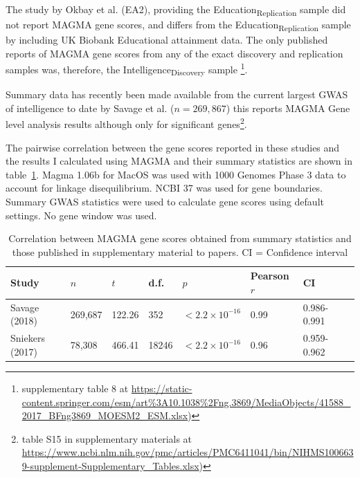 The study by Okbay et al. (EA2)\cite{okbay2016genome}, providing the Education\textsubscript{Replication} sample did not report MAGMA gene scores, and differs from the Education\textsubscript{Replication} sample by including UK Biobank Educational attainment data. The only published reports of MAGMA gene scores from any of the exact discovery and replication samples was, therefore, the Intelligence\textsubscript{Discovery} sample \cite{sniekers2017genome}\footnote{supplementary table 8 at \url{https://static-content.springer.com/esm/art\%3A10.1038\%2Fng.3869/MediaObjects/41588_2017_BFng3869_MOESM2_ESM.xlsx})}.

Summary data has recently been made available from the current largest GWAS of intelligence to date by Savage et al. \cite{savage2018genome} ($n=269,867$) this reports MAGMA Gene level analysis results although only for significant genes\footnote{table S15 in supplementary materials at \url{https://www.ncbi.nlm.nih.gov/pmc/articles/PMC6411041/bin/NIHMS1006639-supplement-Supplementary_Tables.xlsx})}.

The pairwise correlation between the gene scores reported in these studies and the results I calculated using MAGMA and their summary statistics  are shown in table~\ref{tab:Correlation between MAGMA gene scores obtained from summary statistics and those published in supplementary material to papers}. Magma 1.06b for MacOS was used with 1000 Genomes Phase 3 data to account for linkage disequilibrium. NCBI 37 was used for gene boundaries. Summary GWAS statistics were used to calculate gene scores using default settings. No gene window was used.



\begin{table}[ht]
    \centering
        \setlength{\extrarowheight}{2pt}
    \begin{tabular}{llllllll}
    \toprule
        Study & $n$ & $t$ & d.f. & $p$ & Pearson $r$ & CI   \\
        \midrule
       Savage (2018) \cite{savage2018genome} & 269,687 & 122.26& 352  & $<2.2 \times 10^{-16}$ & 0.99 & 0.986-0.991  \\ 
       Sniekers (2017)\cite{sniekers2017genome}& 78,308 & 466.41 & 18246 & $<2.2 \times 10^{-16}$ & 0.96 & 0.959-0.962\\
       \bottomrule
    \end{tabular}
    \caption[MAGMA scores benchmarked against publications]{Correlation between MAGMA gene scores obtained from summary statistics and those published in supplementary material to papers. CI = Confidence interval}
    \label{tab:Correlation between MAGMA gene scores obtained from summary statistics and those published in supplementary material to papers}
\end{table}

